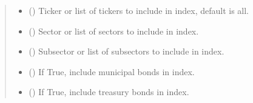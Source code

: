\documentclass[letterpaper,10pt,english]{report}
\begin{document}
\begin{fulllineitems}
\begin{fulllineitems}
\begin{quote}
\begin{description}
\begin{itemize}
\item {} 
 (\sphinxstyleliteralemphasis{\sphinxupquote{, }}\sphinxstyleliteralemphasis{\sphinxupquote{{[}}}\sphinxstyleliteralemphasis{\sphinxupquote{{]}}}\sphinxstyleliteralemphasis{\sphinxupquote{, }}) \textendash{} Ticker or list of tickers to include in index, default is all.

\item {} 
 (\sphinxstyleliteralemphasis{\sphinxupquote{, }}\sphinxstyleliteralemphasis{\sphinxupquote{{[}}}\sphinxstyleliteralemphasis{\sphinxupquote{{]}}}\sphinxstyleliteralemphasis{\sphinxupquote{, }}) \textendash{} Sector or list of sectors to include in index.

\item {} 
 (\sphinxstyleliteralemphasis{\sphinxupquote{, }}\sphinxstyleliteralemphasis{\sphinxupquote{{[}}}\sphinxstyleliteralemphasis{\sphinxupquote{{]}}}\sphinxstyleliteralemphasis{\sphinxupquote{, }}) \textendash{} Subsector or list of subsectors to include in index.

\item {} 
 (\sphinxstyleliteralemphasis{\sphinxupquote{, }}) \textendash{} If True, include municipal bonds in index.

\item {} 
 (\sphinxstyleliteralemphasis{\sphinxupquote{, }}) \textendash{} If True, include treasury bonds in index.


\end{itemize}
\end{description}
\end{quote}
\end{fulllineitems}
\end{fulllineitems}
\end{document}
